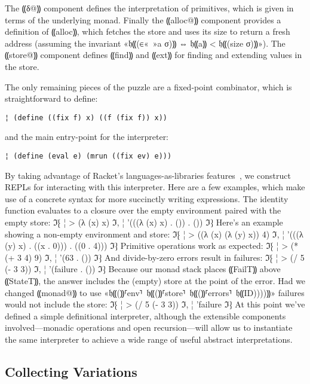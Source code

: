 The ⸨δ@⸩ component defines the interpretation of primitives, which is given in
terms of the underlying monad.  Finally the ⸨alloc@⸩ component provides a
definition of ⸨alloc⸩, which fetches the store and uses its size to return a
fresh address (assuming the invariant «𝔥⸨(∈«\ »a σ)⸩ ⇔ 𝔥⸨a⸩ < 𝔥⸨(size σ)⸩»).
The ⸨store@⸩ component defines ⸨find⸩ and ⸨ext⸩ for finding and extending
values in the store.

The only remaining pieces of the puzzle are a fixed-point combinator, which is
straightforward to define:
\begin{lstlisting}
¦ (define ((fix f) x) ((f (fix f)) x))
\end{lstlisting}
and the main entry-point for the interpreter:
\begin{lstlisting}
¦ (define (eval e) (mrun ((fix ev) e)))
\end{lstlisting}
By taking advantage of Racket's languages-as-libraries
features~\cite{dvanhorn:TobinHochstadt2011Languages}, we construct REPLs for
interacting with this interpreter.  Here are a few examples, which make use of
a concrete syntax for more succinctly writing expressions. The identity
function evaluates to a closure over the empty environment paired with the
empty store:
ℑ⁅
¦ > (λ (x) x)
ℑ,
¦ '(((λ (x) x) . ()) . ())
ℑ⁆
Here's an example showing a non-empty environment and store:
ℑ⁅
¦ > ((λ (x) (λ (y) x)) 4)
ℑ,
¦ '(((λ (y) x) . ((x . 0))) . ((0 . 4)))
ℑ⁆
Primitive operations work as expected:
ℑ⁅
¦ > (* (+ 3 4) 9)
ℑ,
¦ '(63 . ())
ℑ⁆
And divide-by-zero errors result in failures:
ℑ⁅
¦ > (/ 5 (- 3 3))
ℑ,
¦ '(failure . ())
ℑ⁆
Because our monad stack places ⸨FailT⸩ above ⸨StateT⸩, the answer includes the
(empty) store at the point of the error. Had we changed ⸨monad@⸩ to use
«𝔥⸨(⸩\!⸢env⸣\ 𝔥⸨(⸩\!⸢store⸣\
𝔥⸨(⸩\!⸢errors⸣\ 𝔥⸨ID))))⸩» failures would not include the store:
ℑ⁅
¦ > (/ 5 (- 3 3))
ℑ,
¦ 'failure
ℑ⁆
At this point we've defined a simple definitional interpreter, although the
extensible components involved—monadic operations and open recursion—will allow
us to instantiate the same interpreter to achieve a wide range of useful
abstract interpretations.

\subsection{Collecting Variations}\label{s:collecting}

